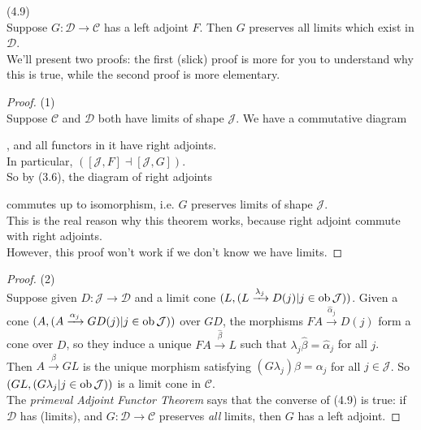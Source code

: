 \documentclass[a4paper]{article}
\begin{document}
\begin{thm} (4.9)\\
    Suppose $G:\mathcal{D} \to \mathcal{C}$ has a left adjoint $F$. Then $G$ preserves all limits which exist in $\mathcal{D}$.\\
    We'll present two proofs: the first (slick) proof is more for you to understand why this is true, while the second proof is more elementary.
    \begin{proof} (1)\\
        Suppose $\mathcal{C}$ and $\mathcal{D}$ both have limits of shape $\mathcal{J}$. We have a commutative diagram
        , and all functors in it have right adjoints.\\
        In particular, $([\mathcal{J},F] \dashv [\mathcal{J},G])$.\\
        So by (3.6), the diagram of right adjoints
        commutes up to isomorphism, i.e. $G$ preserves limits of shape $\mathcal{J}$.\\
        This is the real reason why this theorem works, because right adjoint commute with right adjoints.\\
        However, this proof won't work if we don't know we have limits.
    \end{proof}

    \begin{proof} (2)\\
        Suppose given $D:\mathcal{J} \to \mathcal{D}$ and a limit cone $(L,(L \xrightarrow{\lambda_j} D(j) | j \in \operatorname{ob} \mathcal{J}))$. Given a cone $(A,(A \xrightarrow{\alpha_j} GD(j) | j \in \operatorname{ob}\mathcal{J}))$ over $GD$, the morphisms $FA \xrightarrow{\hat{\alpha}_j} D(j)$ form a cone over $D$, so they induce a unique $FA \xrightarrow{\hat{\beta}} L$ such that $\lambda_j \hat{\beta} = \hat{\alpha}_j$ for all $j$.\\
        Then $A \xrightarrow{\beta} GL$ is the unique morphism satisfying $(G \lambda_j) \beta = \alpha_j$ for all $j \in \mathcal{J}$. So $(GL,(G\lambda_j | j \in \operatorname{ob}\mathcal{J}))$ is a limit cone in $\mathcal{C}$.\\
        The \emph{primeval Adjoint Functor Theorem} says that the converse of (4.9) is true: if $\mathcal{D}$ has (limits), and $G:\mathcal{D} \to \mathcal{C}$ preserves \emph{all} limits, then $G$ has a left adjoint.
    \end{proof}
\end{thm}
\end{document}
